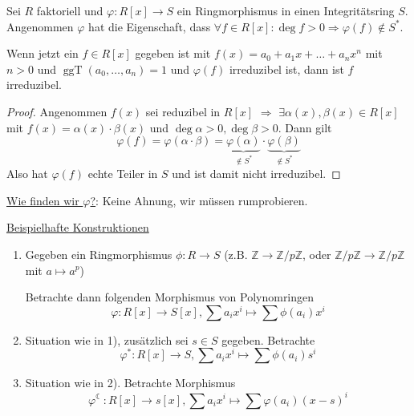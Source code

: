 \documentclass[a4paper,12pt,numbers=noenddot,parskip=full]{scrartcl}
\newcommand{\setZ}{\mathbb{Z}}
\newcommand{\heading}{\underline}
\theoremstyle{dotless}
\theoremstyle{remark}
\begin{document}
	Sei $R$ faktoriell und $\varphi: R[x] \to S$ ein Ringmorphismus in einen Integritätsring $S$. Angenommen $\varphi$ hat die Eigenschaft, dass $\forall f \in R[x]: \deg f > 0 \Rightarrow \varphi(f) \notin S^*$.
	
	Wenn jetzt ein $f \in R[x]$ gegeben ist mit $f(x) = a_0 + a_1 x + \dots + a_n x^n$ mit $n > 0$ und $\operatorname{ggT}(a_0, \dots, a_n) = 1$ und $\varphi(f)$ irreduzibel ist, dann ist $f$ irreduzibel.
	
	\begin{proof}
		Angenommen $f(x)$ sei reduzibel in $R[x]$ $\Rightarrow$ $\exists \alpha(x), \beta(x) \in R[x]$ mit $f(x) = \alpha(x) \cdot \beta(x)$ und $\deg \alpha > 0, \deg \beta > 0$. Dann gilt
		\begin{equation*}
			\varphi(f) = \varphi(\alpha \cdot \beta)  = \underbrace{\varphi(\alpha)}_{\notin S^*} \cdot \underbrace{\varphi(\beta)}_{\notin S^*}
		\end{equation*}
		Also hat $\varphi(f)$ echte Teiler in $S$ und ist damit nicht irreduzibel.
	\end{proof}

	\heading{Wie finden wir $\varphi$?}: Keine Ahnung, wir müssen rumprobieren.
	
	\heading{Beispielhafte Konstruktionen}
	
	\begin{enumerate}
		\item Gegeben ein Ringmorphismus $\phi: R \to S$ (z.B. $\setZ \to \setZ / p \setZ$, oder $\setZ / p \setZ \to \setZ / p \setZ$ mit $ a \mapsto a^p$)
		
		Betrachte dann folgenden Morphismus von Polynomringen
		\begin{equation*}
			\varphi: R[x] \to S[x], \sum a_i x^i \mapsto \sum \phi(a_i) x^i
		\end{equation*}
		
		\item Situation wie in 1), zusätzlich sei $s \in S$ gegeben. Betrachte
		\begin{equation*}
			\varphi^*: R[x] \to S, \sum a_i x^i \mapsto \sum \phi(a_i) s^i	
		\end{equation*}
		
		\item Situation wie in 2). Betrachte Morphismus
		\begin{equation*}
			\varphi^{\leftmoon}: R[x] \to s[x], \sum a_i x^i \mapsto \sum \varphi(a_i) (x - s)^i
		\end{equation*}
	\end{enumerate}
\end{document}
